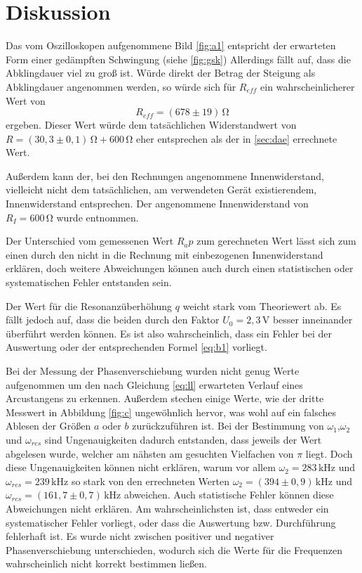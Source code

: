 \section{Diskussion}
\label{sec:Diskussion}
Das vom Oszilloskopen aufgenommene Bild \ref{fig:a1}
entspricht der erwarteten Form einer gedämpften Schwingung (siehe \ref{fig:gsk})
Allerdings fällt auf, dass die Abklingdauer viel zu groß ist.
Würde direkt der Betrag der Steigung als Abklingdauer angenommen werden,
so würde sich für $R_{eff}$ ein wahrscheinlicherer Wert von
\begin{equation*}
    R_{eff}=(678\pm19)\,\si{\ohm}
\end{equation*}
\noindent ergeben. Dieser Wert würde dem tatsächlichen Widerstandwert
von $R=(30,3\pm0,1)\,\si{\ohm} + 600\,\si{\ohm}$ eher entsprechen als der
in \ref{sec:dae} errechnete Wert.


Außerdem kann der, bei den Rechnungen angenommene Innenwiderstand,
vielleicht nicht dem tatsächlichen, am verwendeten Gerät existierendem,
Innenwiderstand entsprechen. Der angenommene Innenwiderstand
von $R_I=600\,\si{\ohm}$ wurde \cite{sample353} entnommen.

Der Unterschied vom gemessenen Wert $R_ap$ zum gerechneten Wert
lässt sich zum einen durch den nicht in die Rechnung 
mit einbezogenen Innenwiderstand erklären, doch weitere Abweichungen
können auch durch  einen statistischen oder systematischen
Fehler entstanden sein.

Der Wert für die Resonanzüberhöhung $q$ weicht stark vom Theoriewert ab.
Es fällt jedoch auf, dass die beiden durch den Faktor $U_0=2,3\,\si{\volt}$
besser inneinander überführt werden können. Es ist also wahrscheinlich,
dass ein Fehler bei der Auswertung oder der entsprechenden Formel \ref{eq:b1}
vorliegt.


Bei der Messung der Phasenverschiebung wurden nicht
genug Werte aufgenommen um den nach Gleichung \ref{eq:ll}
erwarteten Verlauf eines Arcustangens zu erkennen.
Außerdem stechen einige Werte, wie der dritte Messwert
in Abbildung \ref{fig:c} ungewöhnlich hervor, was
wohl auf ein falsches Ablesen der Größen $a$ oder
$b$ zurückzuführen ist. Bei der Bestimmung
von $\omega_1$,$\omega_2$ und $\omega_{res}$ sind Ungenauigkeiten
dadurch entstanden, dass jeweils der Wert abgelesen wurde,
welcher am nähsten am gesuchten Vielfachen von $\pi$
liegt. Doch diese Ungenauigkeiten können nicht erklären,
warum vor allem $\omega_2=283\,\si{\kilo\hertz}$ und $\omega_{res}=239\,\si{\kilo\hertz}$
so stark von den errechneten Werten
$\omega_2=(394\pm0,9)\,\si{\kilo\hertz}$ und $\omega_{res}=(161,7\pm0,7)\,\si{\kilo\hertz}$
abweichen. Auch statistische Fehler können diese Abweichungen nicht erklären.
Am wahrscheinlichsten ist, dass entweder ein systematischer Fehler vorliegt,
oder dass die Auswertung bzw. Durchführung fehlerhaft ist. 
Es wurde nicht zwischen positiver und negativer Phasenverschiebung unterschieden,
wodurch sich die Werte für die Frequenzen wahrscheinlich nicht 
korrekt bestimmen ließen.
